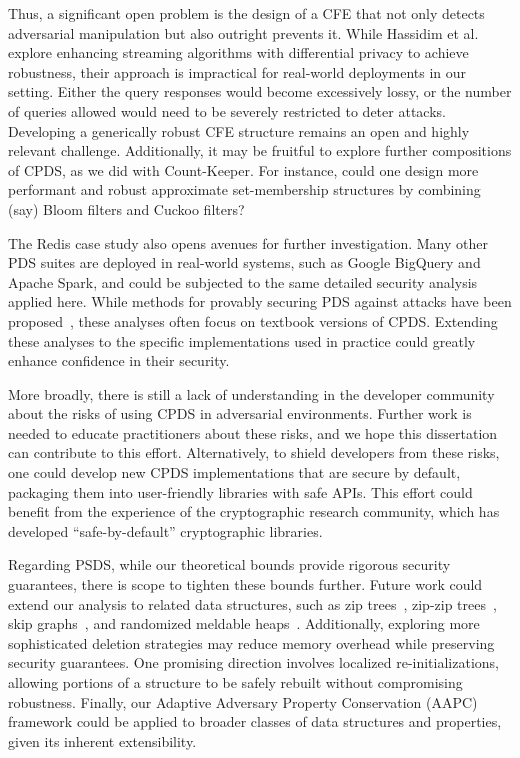 Thus, a significant open problem is the design of a CFE that not only detects adversarial manipulation but also outright prevents it. While Hassidim et al.~\cite{HassidimKMMS20} explore enhancing streaming algorithms with differential privacy to achieve robustness, their approach is impractical for real-world deployments in our setting. Either the query responses would become excessively lossy, or the number of queries allowed would need to be severely restricted to deter attacks. Developing a generically robust CFE structure remains an open and highly relevant challenge. Additionally, it may be fruitful to explore further compositions of CPDS, as we did with Count-Keeper. For instance, could one design more performant and robust approximate set-membership structures by combining (say) Bloom filters and Cuckoo filters?

The Redis case study also opens avenues for further investigation. Many other PDS suites are deployed in real-world systems, such as Google BigQuery and Apache Spark, and could be subjected to the same detailed security analysis applied here. While methods for provably securing PDS against attacks have been proposed~\cite{NaorY15,clayton2019,FPUV22,PatersonR22,markelon23,filic2025deletions}, these analyses often focus on textbook versions of CPDS. Extending these analyses to the specific implementations used in practice could greatly enhance confidence in their security.

More broadly, there is still a lack of understanding in the developer community about the risks of using CPDS in adversarial environments. Further work is needed to educate practitioners about these risks, and we hope this dissertation can contribute to this effort. Alternatively, to shield developers from these risks, one could develop new CPDS implementations that are secure by default, packaging them into user-friendly libraries with safe APIs. This effort could benefit from the experience of the cryptographic research community, which has developed “safe-by-default” cryptographic libraries.

Regarding PSDS, while our theoretical bounds provide rigorous security guarantees, there is scope to tighten these bounds further. Future work could extend our analysis to related data structures, such as zip trees~\cite{tarjan2021zip}, zip-zip trees~\cite{gila2023zip}, skip graphs~\cite{aspnes2007skip}, and randomized meldable heaps~\cite{gambin1998randomized}. Additionally, exploring more sophisticated deletion strategies may reduce memory overhead while preserving security guarantees. One promising direction involves localized re-initializations, allowing portions of a structure to be safely rebuilt without compromising robustness. Finally, our Adaptive Adversary Property Conservation (AAPC) framework could be applied to broader classes of data structures and properties, given its inherent extensibility.